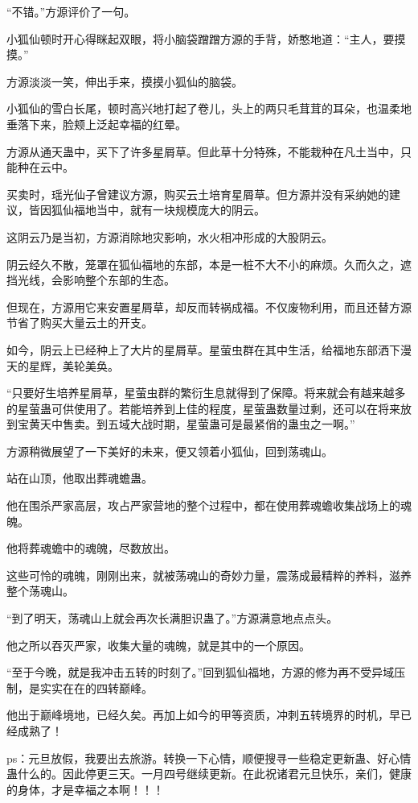 \begin{this_body}
“不错。”方源评价了一句。

小狐仙顿时开心得眯起双眼，将小脑袋蹭蹭方源的手背，娇憨地道：“主人，要摸摸。”

方源淡淡一笑，伸出手来，摸摸小狐仙的脑袋。

小狐仙的雪白长尾，顿时高兴地打起了卷儿，头上的两只毛茸茸的耳朵，也温柔地垂落下来，脸颊上泛起幸福的红晕。

方源从通天蛊中，买下了许多星屑草。但此草十分特殊，不能栽种在凡土当中，只能种在云中。

买卖时，瑶光仙子曾建议方源，购买云土培育星屑草。但方源并没有采纳她的建议，皆因狐仙福地当中，就有一块规模庞大的阴云。

这阴云乃是当初，方源消除地灾影响，水火相冲形成的大股阴云。

阴云经久不散，笼罩在狐仙福地的东部，本是一桩不大不小的麻烦。久而久之，遮挡光线，会影响整个东部的生态。

但现在，方源用它来安置星屑草，却反而转祸成福。不仅废物利用，而且还替方源节省了购买大量云土的开支。

如今，阴云上已经种上了大片的星屑草。星萤虫群在其中生活，给福地东部洒下漫天的星辉，美轮美奂。

“只要好生培养星屑草，星萤虫群的繁衍生息就得到了保障。将来就会有越来越多的星萤蛊可供使用了。若能培养到上佳的程度，星萤蛊数量过剩，还可以在将来放到宝黄天中售卖。到五域大战时期，星萤蛊可是最紧俏的蛊虫之一啊。”

方源稍微展望了一下美好的未来，便又领着小狐仙，回到荡魂山。

站在山顶，他取出葬魂蟾蛊。

他在围杀严家高层，攻占严家营地的整个过程中，都在使用葬魂蟾收集战场上的魂魄。

他将葬魂蟾中的魂魄，尽数放出。

这些可怜的魂魄，刚刚出来，就被荡魂山的奇妙力量，震荡成最精粹的养料，滋养整个荡魂山。

“到了明天，荡魂山上就会再次长满胆识蛊了。”方源满意地点点头。

他之所以吞灭严家，收集大量的魂魄，就是其中的一个原因。

“至于今晚，就是我冲击五转的时刻了。”回到狐仙福地，方源的修为再不受异域压制，是实实在在的四转巅峰。

他出于巅峰境地，已经久矣。再加上如今的甲等资质，冲刺五转境界的时机，早已经成熟了！

ps：元旦放假，我要出去旅游。转换一下心情，顺便搜寻一些稳定更新蛊、好心情蛊什么的。因此停更三天。一月四号继续更新。在此祝诸君元旦快乐，亲们，健康的身体，才是幸福之本啊！！！

\end{this_body}

